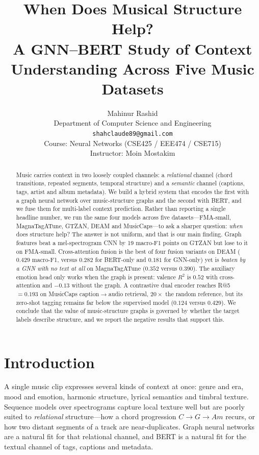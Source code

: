 \documentclass{article}
\title{When Does Musical Structure Help?\\
A GNN--BERT Study of Context Understanding Across Five Music Datasets}
\author{%
  Mahinur Rashid \\
  Department of Computer Science and Engineering \\
  \texttt{shahclaude89@gmail.com} \\
  \And
  Course: Neural Networks (CSE425 / EEE474 / CSE715) \\
  Instructor: Moin Mostakim \\
}
\begin{document}
\maketitle

\begin{abstract}
Music carries context in two loosely coupled channels: a \emph{relational} channel
(chord transitions, repeated segments, temporal structure) and a \emph{semantic}
channel (captions, tags, artist and album metadata). We build a hybrid system that
encodes the first with a graph neural network over music-structure graphs and the
second with BERT, and we fuse them for multi-label context prediction. Rather than
reporting a single headline number, we run the same four models across five
datasets---FMA-small, MagnaTagATune, GTZAN, DEAM and MusicCaps---to ask a sharper
question: \emph{when} does structure help? The answer is not uniform, and that is
our main finding. Graph features beat a mel-spectrogram CNN by 19 macro-F1 points
on GTZAN but lose to it on FMA-small. Cross-attention fusion is the best of four
fusion variants on DEAM ($0.429$ macro-F1, versus $0.282$ for BERT-only and
$0.181$ for GNN-only) yet is \emph{beaten by a GNN with no text at all} on
MagnaTagATune ($0.352$ versus $0.390$). The auxiliary emotion head only works when
the graph is present: valence $R^2$ is $0.52$ with cross-attention and $-0.13$
without the graph. A contrastive dual encoder reaches R@5 $=0.193$ on MusicCaps
caption$\rightarrow$audio retrieval, $20\times$ the random reference, but its
zero-shot tagging remains far below the supervised model ($0.124$ versus
$0.429$). We conclude that the value of music-structure graphs is governed by
whether the target labels describe structure, and we report the negative results
that support this.
\end{abstract}

\section{Introduction}

A single music clip expresses several kinds of context at once: genre and era,
mood and emotion, harmonic structure, lyrical semantics and timbral texture.
Sequence models over spectrograms capture local texture well but are poorly suited
to \emph{relational} structure---how a chord progression $C \rightarrow G
\rightarrow Am$ recurs, or how two distant segments of a track are near-duplicates.
Graph neural networks are a natural fit for that relational channel, and BERT is a
natural fit for the textual channel of tags, captions and metadata.
\end{document}
